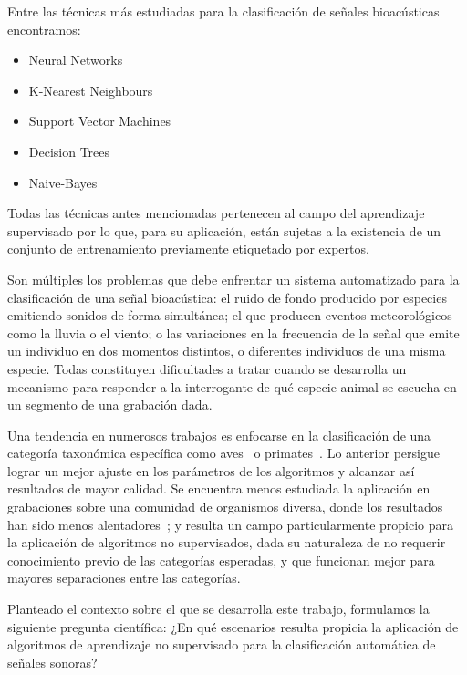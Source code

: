Entre las técnicas más estudiadas para la clasificación de señales bioacústicas encontramos:
\begin{itemize}
    \item Neural Networks~\cite{Gerhard03,Deecke05}
    \item K-Nearest Neighbours~\cite{Dunkel06}
    \item Support Vector Machines~\cite{Ilyas14}
    \item Decision Trees~\cite{Lasseck14}
    \item Naive-Bayes~\cite{Dunkel06}
\end{itemize}

Todas las técnicas antes mencionadas pertenecen al campo del aprendizaje supervisado por lo que, para su aplicación, están sujetas a la existencia de un conjunto de entrenamiento previamente etiquetado por expertos.

Son múltiples los problemas que debe enfrentar un sistema automatizado para la clasificación de una señal bioacústica: el ruido de fondo producido por especies emitiendo sonidos de forma simultánea;
el que producen eventos meteorológicos como la lluvia o el viento;
o las variaciones en la frecuencia de la señal que emite un individuo en dos momentos distintos, o diferentes individuos de una misma especie.
Todas constituyen dificultades a tratar cuando se desarrolla un mecanismo para responder a la interrogante de qué especie animal se escucha en un segmento de una grabación dada.

Una tendencia en numerosos trabajos es enfocarse en la clasificación de una categoría taxonómica específica como aves~\cite{Lasseck14,Oliveira15,Stowell14} o primates~\cite{Heinicke15}.
Lo anterior persigue lograr un mejor ajuste en los parámetros de los algoritmos y alcanzar así resultados de mayor calidad.
Se encuentra menos estudiada la aplicación en grabaciones sobre una comunidad de organismos diversa, donde los resultados han sido menos alentadores~\cite{Ilyas14}; y resulta un campo particularmente propicio para la aplicación de algoritmos no supervisados, dada su naturaleza de no requerir conocimiento previo de las categorías esperadas, y que funcionan mejor para mayores separaciones entre las categorías.

Planteado el contexto sobre el que se desarrolla este trabajo, formulamos la siguiente pregunta científica: ¿En qué escenarios resulta propicia la aplicación de algoritmos de aprendizaje no supervisado para la clasificación automática de señales sonoras?

